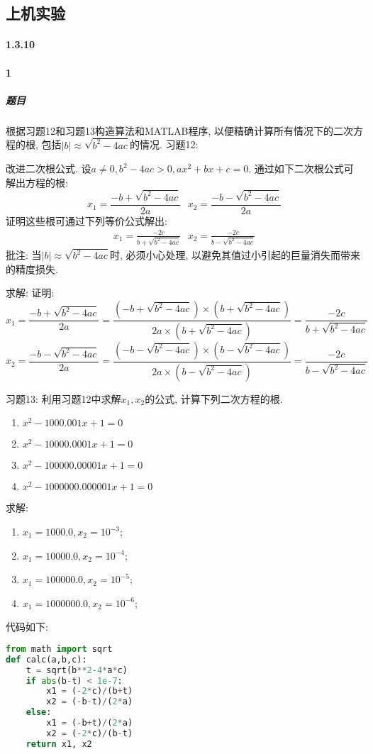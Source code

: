 \documentclass{ctexart}
\begin{document}
\subsection{上机实验}
	\paragraph{1.3.10}
	\paragraph{1}
		\subparagraph{题目}
		根据习题12和习题13构造算法和MATLAB程序, 以便精确计算所有情况下的二次方程的根, 包括$\left|b\right| \approx \sqrt{b^2 - 4ac}$的情况.
		习题12:
		
		改进二次根公式. 设$a \neq 0, b^2-4ac>0, ax^2+bx+c=0$. 通过如下二次根公式可解出方程的根:
		\begin{equation}
			x_1 = \frac{-b+\sqrt{b^2-4ac}}{2a} \ \ \
			x_2 = \frac{-b-\sqrt{b^2-4ac}}{2a}
		\end{equation}
		证明这些根可通过下列等价公式解出:
		\begin{equation}
			\begin{aligned}
				x_1 = \frac{-2c}{b+\sqrt{b^2-4ac}} \ \ \
				x_2 = \frac{-2c}{b-\sqrt{b^2-4ac}}
			\end{aligned}
		\end{equation}
		批注: 当$\left|b \right| \approx \sqrt{b^2-4ac}$时, 必须小心处理, 以避免其值过小引起的巨量消失而带来的精度损失.
		
		求解:
		证明:
		$$x_1 = \frac{-b+\sqrt{b^2-4ac}}{2a} = \frac{\left(-b+\sqrt{b^2-4ac}\right)\times \left(b+\sqrt{b^2-4ac}\right)}{2a\times\left(b+\sqrt{b^2-4ac}\right)} = \frac{-2c}{b+\sqrt{b^2-4ac}}$$
		$$x_2 = \frac{-b-\sqrt{b^2-4ac}}{2a} = \frac{\left(-b-\sqrt{b^2-4ac}\right)\times \left(b-\sqrt{b^2-4ac}\right)}{2a\times \left(b-\sqrt{b^2-4ac}\right)} = \frac{-2c}{b-\sqrt{b^2-4ac}}$$
		
		习题13: 利用习题12中求解$x_1,x_2$的公式, 计算下列二次方程的根.
		\begin{enumerate}
			\item $x^2-1000.001x+1=0$
			\item $x^2-10000.0001x+1=0$
			\item $x^2-100000.00001x+1=0$
			\item $x^2-1000000.000001x+1=0$
		\end{enumerate}
	
		求解:
		\begin{enumerate}
			\item $x_1 = 1000.0, x_2 = 10^{-3}$;
			\item $x_1 = 10000.0, x_2 = 10^{-4}$;
			\item $x_1 = 100000.0 , x_2 = 10^{-5}$;
			\item $x_1 = 1000000.0 , x_2 = 10^{-6}$;
		\end{enumerate}
		代码如下:
		\begin{lstlisting}[language=python]
from math import sqrt
def calc(a,b,c):
    t = sqrt(b**2-4*a*c)
    if abs(b-t) < 1e-7:
        x1 = (-2*c)/(b+t)
        x2 = (-b-t)/(2*a)
    else:
        x1 = (-b+t)/(2*a)
        x2 = (-2*c)/(b-t)
    return x1, x2
		\end{lstlisting}
\end{document}
